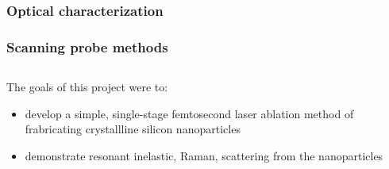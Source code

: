         \subsubsection{Optical characterization}
        \subsubsection{Scanning probe methods}

    \subsection{}
            The goals of this project were to:
            \begin{itemize}
                \item develop a simple, single-stage femtosecond laser ablation method of frabricating crystallline silicon nanoparticles
                \item demonstrate resonant inelastic, Raman, scattering from the nanoparticles
            \end{itemize}

